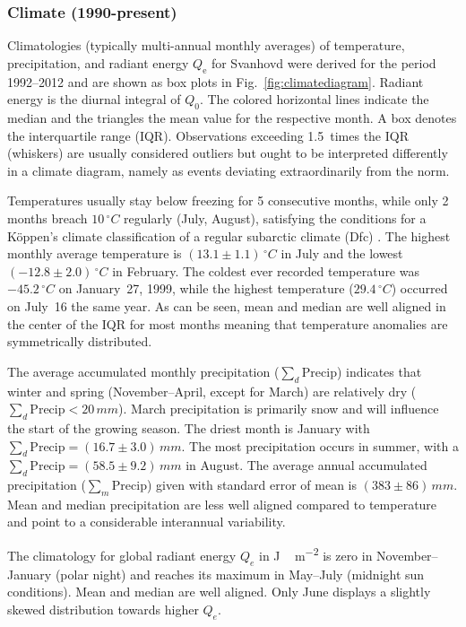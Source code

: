\documentclass[bg, manuscript]{copernicus}
\begin{document}
\subsubsection{Climate (1990-present)}
\label{subsec:climatologies}

Climatologies (typically multi-annual monthly averages) of temperature, precipitation, and radiant energy $Q_\mathrm{e}$ for Svanhovd were derived for the period 1992--2012 and are shown as box plots in Fig.~\ref{fig:climatediagram}. Radiant energy is the diurnal integral of $Q_0$. The colored horizontal lines indicate the median and the triangles the mean value for the respective month. A box denotes the interquartile range (IQR). Observations exceeding 1.5~times the IQR (whiskers) are usually considered outliers but ought to be interpreted differently in a climate diagram, namely as events deviating extraordinarily from the norm.

Temperatures usually stay below freezing for 5 consecutive months, while only 2 months breach $10\,\unit{^\circ C}$ regularly (July, August), satisfying the conditions for a K\"{o}ppen's climate classification of a regular subarctic climate (Dfc) \citep[e.g.][]{SD:Beck2018}. The highest monthly average temperature is $(13.1\pm 1.1)\,\unit{^\circ C}$ in July and the lowest $(-12.8\pm 2.0)\,\unit{^\circ C}$ in February. The coldest ever recorded temperature was $-45.2\,\unit{^\circ C}$ on January~27, 1999, while the highest temperature ($29.4\,\unit{^\circ C}$) occurred on July~16 the same year. As can be seen, mean and median are well aligned in the center of the IQR for most months meaning that temperature anomalies are symmetrically distributed.

The average accumulated monthly precipitation ($\sum_d\mathrm{Precip}$) indicates that winter and spring (November--April, except for March) are relatively dry ($\sum_d\mathrm{Precip} < 20\,\unit{mm}$). March precipitation is primarily snow and will influence the start of the growing season. The driest month is January with $\sum_d\mathrm{Precip} = (16.7\pm 3.0)\,\unit{mm}$. The most precipitation occurs in summer, with a $\sum_d\mathrm{Precip} = (58.5\pm 9.2)\,\unit{mm}$ in August. The average annual accumulated precipitation ($\sum_m\mathrm{Precip}$) given with standard error of mean is $(383\pm 86)\,\unit{mm}$. Mean and median precipitation are less well aligned compared to temperature and point to a considerable interannual variability.

The climatology for global radiant energy $Q_e$ in \unit{J\,m^{-2}} is zero in November--January (polar night) and reaches its maximum in May--July (midnight sun conditions). Mean and median are well aligned. Only June displays a slightly skewed distribution towards higher $Q_e$.
\end{document}
